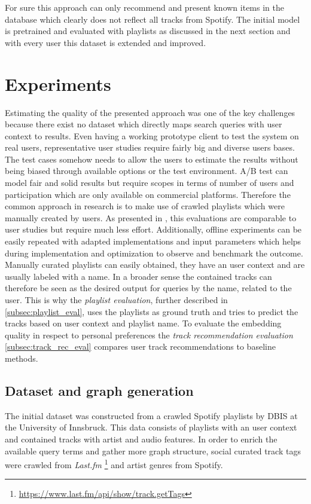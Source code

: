 \documentclass[a4paper]{llncs}
\begin{document}
	For sure this approach can only recommend and present known items in the database which clearly does not reflect all tracks from Spotify. The initial model is pretrained and evaluated with playlists as discussed in the next section and with every user this dataset is extended and improved.
	
	\section{Experiments}
	Estimating the quality of the presented approach was one of the key challenges because there exist no dataset which directly maps search queries with user context to results. Even having a working prototype client to test the system on real users, representative user studies require fairly big and diverse users bases. The test cases somehow needs to allow the users to estimate the results without being biased through available options or the test environment. A/B test can model fair and solid results but require scopes in terms of number of users and participation which are only available on commercial platforms. Therefore the common approach in research is to make use of crawled playlists which were manually created by users. As presented in \cite{kamehkhosh2017user}, this evaluations are comparable to user studies but require much less effort. Additionally, offline experiments can be easily repeated with adapted implementations and input parameters which helps during implementation and optimization to observe and benchmark the outcome. \\
	
	Manually curated playlists can easily obtained, they have an user context and are usually labeled with a name. In a broader sense the contained tracks can therefore be seen as the desired output for queries by the name, related to the user. This is why the \emph{playlist evaluation}, further described in \ref{subsec:playlist_eval}, uses the playlists as ground truth and tries to predict the tracks based on user context and playlist name. To evaluate the embedding quality in respect to personal preferences the \emph{track recommendation evaluation} \ref{subsec:track_rec_eval} compares user track recommendations to baseline methods.
	
	
	\subsection{Dataset and graph generation}
	The initial dataset was constructed from a crawled Spotify playlists by DBIS at the University of Innsbruck\cite{pichl2017improving}. This data consists of playlists with an user context and contained tracks with artist and audio features. In order to enrich the available query terms and gather more graph structure, social curated track tags were crawled from \emph{Last.fm} \footnote{\url{https://www.last.fm/api/show/track.getTags}} and artist genres from Spotify.
	
\end{document}
